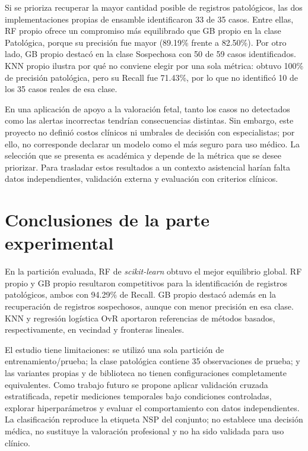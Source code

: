 Si se prioriza recuperar la mayor cantidad posible de registros patol\'ogicos, las dos implementaciones propias de ensamble identificaron 33 de 35 casos. Entre ellas, RF propio ofrece un compromiso m\'as equilibrado que GB propio en la clase Patol\'ogica, porque su precisi\'on fue mayor (89.19\% frente a 82.50\%). Por otro lado, GB propio destac\'o en la clase Sospechosa con 50 de 59 casos identificados. KNN propio ilustra por qu\'e no conviene elegir por una sola m\'etrica: obtuvo 100\% de precisi\'on patol\'ogica, pero su Recall fue 71.43\%, por lo que no identific\'o 10 de los 35 casos reales de esa clase.

En una aplicaci\'on de apoyo a la valoraci\'on fetal, tanto los casos no detectados como las alertas incorrectas tendr\'ian consecuencias distintas. Sin embargo, este proyecto no defini\'o costos cl\'inicos ni umbrales de decisi\'on con especialistas; por ello, no corresponde declarar un modelo como el m\'as seguro para uso m\'edico. La selecci\'on que se presenta es acad\'emica y depende de la m\'etrica que se desee priorizar. Para trasladar estos resultados a un contexto asistencial har\'ian falta datos independientes, validaci\'on externa y evaluaci\'on con criterios cl\'inicos.

\section{Conclusiones de la parte experimental}
En la partici\'on evaluada, RF de \textit{scikit-learn} obtuvo el mejor equilibrio global. RF propio y GB propio resultaron competitivos para la identificaci\'on de registros patol\'ogicos, ambos con 94.29\% de Recall. GB propio destac\'o adem\'as en la recuperaci\'on de registros sospechosos, aunque con menor precisi\'on en esa clase. KNN y regresi\'on log\'istica OvR aportaron referencias de m\'etodos basados, respectivamente, en vecindad y fronteras lineales.

El estudio tiene limitaciones: se utiliz\'o una sola partici\'on de entrenamiento/prueba; la clase patol\'ogica contiene 35 observaciones de prueba; y las variantes propias y de biblioteca no tienen configuraciones completamente equivalentes. Como trabajo futuro se propone aplicar validaci\'on cruzada estratificada, repetir mediciones temporales bajo condiciones controladas, explorar hiperpar\'ametros y evaluar el comportamiento con datos independientes. La clasificaci\'on reproduce la etiqueta NSP del conjunto; no establece una decisi\'on m\'edica, no sustituye la valoraci\'on profesional y no ha sido validada para uso cl\'inico.

